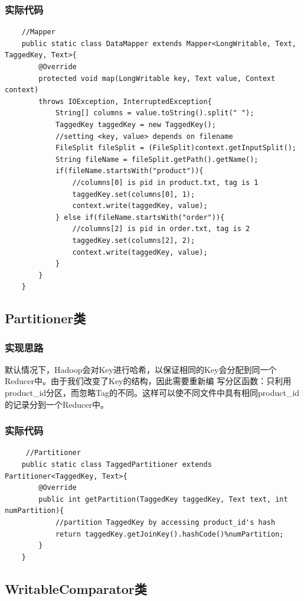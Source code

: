 \documentclass{article}
\begin{document}
\subsubsection{实际代码}

\begin{lstlisting}
	//Mapper
	public static class DataMapper extends Mapper<LongWritable, Text, TaggedKey, Text>{
		@Override
		protected void map(LongWritable key, Text value, Context context)
		throws IOException, InterruptedException{
			String[] columns = value.toString().split(" ");
			TaggedKey taggedKey = new TaggedKey();
			//setting <key, value> depends on filename
			FileSplit fileSplit = (FileSplit)context.getInputSplit();
			String fileName = fileSplit.getPath().getName();
			if(fileName.startsWith("product")){
				//columns[0] is pid in product.txt, tag is 1
				taggedKey.set(columns[0], 1);
				context.write(taggedKey, value);
			} else if(fileName.startsWith("order")){
				//columns[2] is pid in order.txt, tag is 2
				taggedKey.set(columns[2], 2);
				context.write(taggedKey, value);
			}
		}
	}
\end{lstlisting}

\subsection{Partitioner类}

\subsubsection{实现思路}
默认情况下，Hadoop会对Key进行哈希，以保证相同的Key会分配到同一个Reducer中。由于我们改变了Key的结构，因此需要重新编 写分区函数：只利用product\_id分区，而忽略Tag的不同。这样可以使不同文件中具有相同product\_id的记录分到一个Reducer中。

\subsubsection{实际代码}
\begin{lstlisting}
	 //Partitioner
	public static class TaggedPartitioner extends Partitioner<TaggedKey, Text>{
		@Override
		public int getPartition(TaggedKey taggedKey, Text text, int numPartition){
			//partition TaggedKey by accessing product_id's hash
			return taggedKey.getJoinKey().hashCode()%numPartition;
		}
	}
\end{lstlisting}

\subsection{WritableComparator类}
\end{document}
